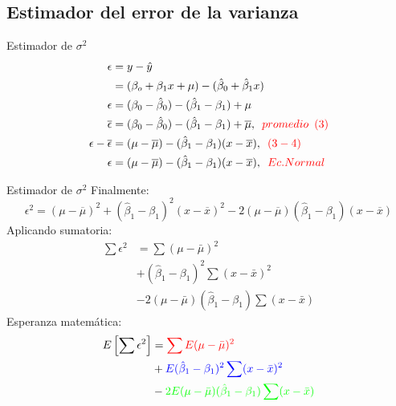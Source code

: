 \subsection{Estimador del error de la varianza}
\begin{frame}{Estimador de $\sigma^{2}$}
	\begin{align}
		\epsilon	& = y - \hat{y}\\
		& = (\beta_{o}+\beta_{1}x+\mu) - (\hat{\beta}_{0}+\hat{\beta}_{1}x)\\
		\epsilon	& = (\beta_{0} - \hat{\beta}_{0}) - (\hat{\beta}_{1} - \beta_{1}) + \mu\\
		\overline{\epsilon}	& = (\beta_{0} - \hat{\beta}_{0}) - (\hat{\beta}_{1} - \beta_{1}) + \overline{\mu},\enskip \textcolor{red}{promedio\enskip (3)}\\
		\epsilon - \overline{\epsilon}	& = (\mu - \overline{\mu}) - (\hat{\beta}_{1} - \beta_{1})(x - \overline{x}),\enskip \textcolor{red}{(3-4)} \\
		\epsilon	& = (\mu - \overline{\mu})- (\hat{\beta}_{1} - \beta_{1})(x - \overline{x}),\enskip \textcolor{red}{Ec. Normal}
	\end{align}
\end{frame}
\begin{frame}{Estimador de $\sigma^{2}$}
	Finalmente:
	$$\epsilon^{2} = (\mu - \overline{\mu})^{2} + (\hat{\beta}_{1} - \beta_{1})^{2}(x - \overline{x})^{2}-2(\mu - \overline{\mu})(\hat{\beta}_{1} - \beta_{1})(x - \overline{x})$$
	Aplicando sumatoria:
	\begin{align*}
		\sum\epsilon^2	& = \sum(\mu-\bar\mu)^2 \\
		&  +(\hat\beta_1 -\beta_1)^2\sum(x-\bar x)^2\\
		&  -2 (\mu-\bar\mu)(\hat\beta_1 -\beta_1)\sum(x-\bar x)
	\end{align*}
	Esperanza matemática:
	\begin{align*}
		E\left[\sum\epsilon^2\right]	&=\textcolor{red}{\sum E(\mu-\bar\mu)^2} \\
		&+ \textcolor{blue}{E(\hat\beta_1 -\beta_1)^2\sum(x-\bar x)^2}\\
		&-\textcolor{green}{2 E(\mu-\bar\mu)(\hat\beta_1 -\beta_1)\sum(x-\bar x)} 
	\end{align*}
\end{frame}
